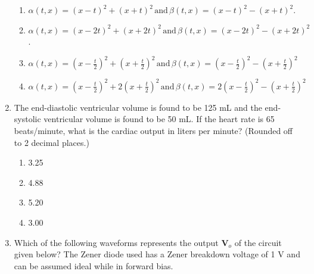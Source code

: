 \documentclass[a4paper,12pt]{exam}
\numberwithin{equation}{enumi}
\numberwithin{figure}{enumi}
\begin{document}
\begin{enumerate}
\begin{enumerate}
\item $\alpha(t, x) = (x -t)^2 + (x + t)^2 \, \text{and} \, \beta(t, x) = (x - t)^2 - (x + t)^2$.
\vspace{0.25cm}
\item $\alpha(t, x) = (x - 2t)^2 + (x + 2t)^2 \, \text{and} \,  \beta(t, x) = (x - 2t)^2 - (x + 2t)^2$.
\vspace{0.25cm}
\item $\alpha(t, x) = \left(x - \frac{t}{2}\right)^2 + \left(x + \frac{t}{2}\right)^2 \, \text{and} \, \beta(t, x) = \left(x - \frac{t}{2}\right)^2 - \left(x + \frac{t}{2}\right)^2$
\vspace{0.25cm}
\item $\alpha(t, x) = \left(x - \frac{t}{2}\right)^2 + 2\left(x + \frac{t}{2}\right)^2 \, \text{and} \, \beta(t, x) = 2\left(x - \frac{t}{2}\right)^2 - \left(x + \frac{t}{2}\right)^2$
\vspace{0.5cm}
\end{enumerate}  

\item The end-diastolic ventricular volume is found to be 125 mL and the end-systolic  ventricular volume is found to be 50 mL. If the heart rate is 65 beats/minute, what is the cardiac output in liters per minute? (Rounded off to 2 decimal places.)

\hfill{}

\begin{multicols}{4}
\begin{enumerate}
\item 3.25
\vspace{0.5cm}
\item 4.88
\vspace{0.5cm}
\item 5.20
\vspace{0.5cm}
\item 3.00
\vspace{0.5cm}
\end{enumerate} 
\end{multicols}

\item Which of the following waveforms represents the output $\textbf{V}_o$ of the circuit given  below? The Zener diode used has a Zener breakdown voltage of 1 V and can be  assumed ideal while in forward bias.

\hfill{}


\end{enumerate}
\end{document}
